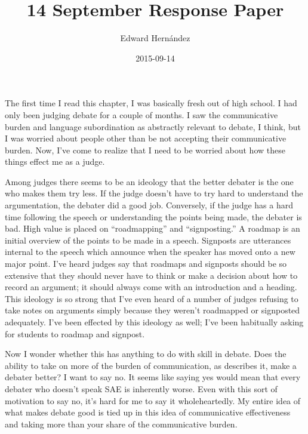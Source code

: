 \documentclass[doc,12pt]{apa6}
\begin{document}
\title{14 September Response Paper}
\author{Edward Hern\'{a}ndez}
\date{2015-09-14}
\maketitle

The first time I read this chapter, I was basically fresh out of high school. I
had only been judging debate for a couple of months. I saw the communicative
burden and language subordination as abstractly relevant to debate, I think,
but I was worried about people other than be not accepting their communicative
burden. Now, I've come to realize that I need to be worried about how these
things effect me as a judge. 

Among judges there seems to be an ideology that the better debater is the one
who makes them try less. If the judge doesn't have to try hard to understand
the argumentation, the debater did a good job. Conversely, if the judge has a
hard time following the speech or understanding the points being made, the
debater is bad. High value is placed on “roadmapping” and “signposting.” A
roadmap is an initial overview of the points to be made in a speech. Signposts
are utterances internal to the speech which announce when the speaker has moved
onto a new major point. I've heard judges say that roadmaps and signposts
should be so extensive that they should never have to think or make a decision
about how to record an argument; it should always come with an introduction and
a heading. This ideology is so strong that I've even heard of a number of
judges refusing to take notes on arguments simply because they weren't
roadmapped or signposted adequately. I've been effected by this ideology as
well; I've been habitually asking for students to roadmap and signpost. 

Now I wonder whether this has anything to do with skill in debate.  Does the
ability to take on more of the burden of communication, as
 describes it, make a debater better? 
I want to say no. It seems like saying yes would mean that every debater who
doesn't speak SAE is inherently worse. Even with this sort of motivation to say
no, it's hard for me to say it wholeheartedly. My entire idea of what makes
debate good is tied up in this idea of communicative effectiveness and taking
more than your share of the communicative burden.
\end{document}

